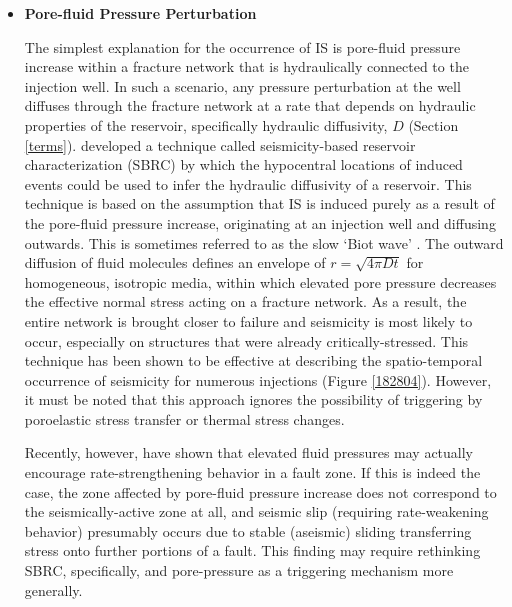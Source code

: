 \begin{itemize}
  \item{\textbf{Pore-fluid Pressure Perturbation}}
  
  The simplest explanation for the occurrence of IS is pore-fluid pressure increase within a fracture network that is hydraulically connected to the injection well. In such a scenario, any pressure perturbation at the well diffuses through the fracture network at a rate that depends on hydraulic properties of the reservoir, specifically hydraulic \gls{diffusivity}, $D$ (Section \ref{terms}). \citet{Shapiro_2002} developed a technique called seismicity-based reservoir characterization (SBRC) by which the hypocentral locations of induced events could be used to infer the hydraulic \gls{diffusivity} of a reservoir. This technique is based on the assumption that IS is induced purely as a result of the pore-fluid pressure increase, originating at an injection well and diffusing outwards. This is sometimes referred to as the slow `Biot wave' \citep{Biot_1956}. The outward diffusion of fluid molecules defines an envelope of $r = \sqrt{4\pi{D}t}$ for homogeneous, isotropic media, within which elevated pore pressure decreases the effective normal stress acting on a fracture network. As a result, the entire network is brought closer to failure and seismicity is most likely to occur, especially on structures that were already critically-stressed. This technique has been shown to be effective at describing the spatio-temporal occurrence of seismicity for numerous injections \citep[e.g.][]{Shapiro_1997,Shapiro_2009,Parotidis_2004,Jeanne_2014} (Figure \ref{182804}). However, it must be noted that this approach ignores the possibility of triggering by poroelastic stress transfer or thermal stress changes.
  
  Recently, however, \citet{cappa2019stabilization} have shown that elevated fluid pressures may actually encourage rate-strengthening behavior in a fault zone. If this is indeed the case, the zone affected by pore-fluid pressure increase does not correspond to the seismically-active zone at all, and seismic slip (requiring rate-weakening behavior) presumably occurs due to stable (aseismic) sliding transferring stress onto further portions of a fault. This finding may require rethinking SBRC, specifically, and pore-pressure as a triggering mechanism more generally.
\end{itemize}

